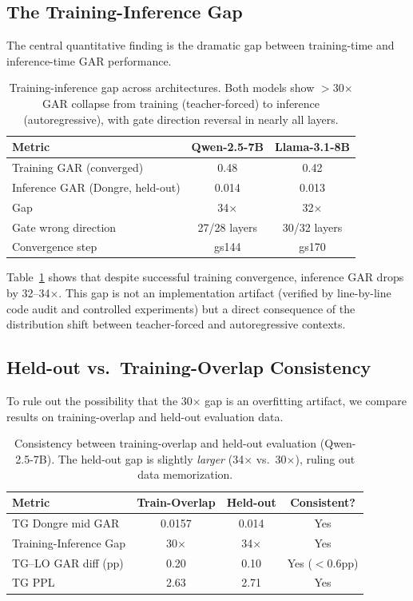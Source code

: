 \documentclass[11pt,a4paper]{article}
\begin{document}
\subsection{The Training-Inference Gap}

The central quantitative finding is the dramatic gap between training-time and inference-time GAR performance.

\begin{table}[h]
\centering
\caption{Training-inference gap across architectures. Both models show $>$30$\times$ GAR collapse from training (teacher-forced) to inference (autoregressive), with gate direction reversal in nearly all layers.}
\label{tab:gap}
\begin{tabular}{lcc}
\toprule
\textbf{Metric} & \textbf{Qwen-2.5-7B} & \textbf{Llama-3.1-8B} \\
\midrule
Training GAR (converged)   & 0.48   & 0.42 \\
Inference GAR (Dongre, held-out) & 0.014 & 0.013 \\
Gap                        & 34$\times$ & 32$\times$ \\
Gate wrong direction       & 27/28 layers & 30/32 layers \\
Convergence step           & gs144  & gs170 \\
\bottomrule
\end{tabular}
\end{table}

Table~\ref{tab:gap} shows that despite successful training convergence, inference GAR drops by 32--34$\times$.
This gap is not an implementation artifact (verified by line-by-line code audit and controlled experiments) but a direct consequence of the distribution shift between teacher-forced and autoregressive contexts.

\subsection{Held-out vs.\ Training-Overlap Consistency}

To rule out the possibility that the 30$\times$ gap is an overfitting artifact, we compare results on training-overlap and held-out evaluation data.

\begin{table}[h]
\centering
\caption{Consistency between training-overlap and held-out evaluation (Qwen-2.5-7B). The held-out gap is slightly \emph{larger} (34$\times$ vs.\ 30$\times$), ruling out data memorization.}
\label{tab:consistency}
\begin{tabular}{lccc}
\toprule
\textbf{Metric} & \textbf{Train-Overlap} & \textbf{Held-out} & \textbf{Consistent?} \\
\midrule
TG Dongre mid GAR     & 0.0157 & 0.014 & Yes \\
Training-Inference Gap & 30$\times$   & 34$\times$  & Yes \\
TG--LO GAR diff (pp)  & 0.20   & 0.10  & Yes ($<$0.6pp) \\
TG PPL                 & 2.63   & 2.71  & Yes \\
\bottomrule
\end{tabular}
\end{table}
\end{document}
